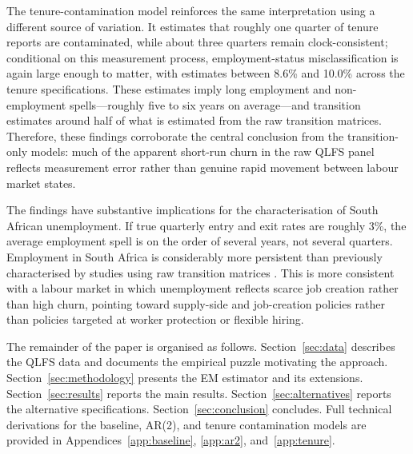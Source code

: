 The tenure-contamination model reinforces the same interpretation using a
different source of variation. It estimates that roughly one quarter of tenure
reports are contaminated, while about three quarters remain clock-consistent;
conditional on this measurement process, employment-status misclassification is
again large enough to matter, with estimates between 8.6\% and 10.0\% across the
tenure specifications. These estimates imply long employment and non-employment
spells---roughly five to six years on average---and transition estimates
around half of what is estimated from the raw transition matrices. 
Therefore, these findings corroborate the central conclusion from 
the transition-only models: much of the apparent short-run
churn in the raw QLFS panel reflects measurement error rather than genuine rapid
movement between labour market states.

The findings have substantive implications for the characterisation of South
African unemployment. If true quarterly entry and exit rates are roughly 3\%,
the average employment spell is on the order of several years, not several
quarters. Employment in South Africa is considerably more persistent than
previously characterised by studies using raw transition matrices
\citep{banerjee2008,cichello2014,kerr2018}. This is more consistent with a
labour market in which unemployment reflects scarce job creation rather than
high churn, pointing toward supply-side and job-creation policies rather than
policies targeted at worker protection or flexible hiring.

The remainder of the paper is organised as follows. Section~\ref{sec:data}
describes the QLFS data and documents the empirical puzzle motivating the
approach. Section~\ref{sec:methodology} presents the EM estimator and its
extensions. Section~\ref{sec:results} reports the main results.
Section~\ref{sec:alternatives} reports the alternative specifications.
Section~\ref{sec:conclusion} concludes. Full technical derivations for the
baseline, AR(2), and tenure contamination models are provided in
Appendices~\ref{app:baseline}, \ref{app:ar2}, and~\ref{app:tenure}.
